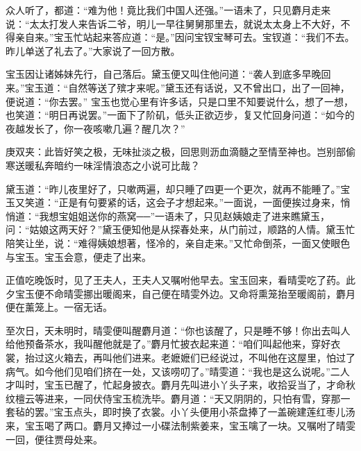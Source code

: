 \begin{parag}
    众人听了，都道：“难为他！竟比我们中国人还强。”一语未了，只见麝月走来说：“太太打发人来告诉二爷，明儿一早往舅舅那里去，就说太太身上不大好，不得亲自来。”宝玉忙站起来答应道：“是。”因问宝钗宝琴可去。宝钗道：“我们不去。昨儿单送了礼去了。”大家说了一回方散。
\end{parag}


\begin{parag}
    宝玉因让诸姊妹先行，自己落后。黛玉便又叫住他问道：“袭人到底多早晚回来。”宝玉道：“自然等送了殡才来呢。”黛玉还有话说，又不曾出口，出了一回神，便说道：“你去罢。” 宝玉也觉心里有许多话，只是口里不知要说什么，想了一想，也笑道：“明日再说罢。”一面下了阶矶，低头正欲迈步，复又忙回身问道：“如今的夜越发长了，你一夜咳嗽几遍？醒几次？”\begin{note}庚双夹：此皆好笑之极，无味扯淡之极，回思则沥血滴髓之至情至神也。岂别部偷寒送暖私奔暗约一味淫情浪态之小说可比哉？\end{note}黛玉道：“昨儿夜里好了，只嗽两遍，却只睡了四更一个更次，就再不能睡了。”宝玉又笑道：“正是有句要紧的话，这会子才想起来。”一面说，一面便挨过身来，悄悄道：“我想宝姐姐送你的燕窝──”一语未了，只见赵姨娘走了进来瞧黛玉，问：“姑娘这两天好？”黛玉便知他是从探春处来，从门前过，顺路的人情。黛玉忙陪笑让坐，说：“难得姨娘想著，怪冷的，亲自走来。”又忙命倒茶，一面又使眼色与宝玉。宝玉会意，便走了出来。
\end{parag}


\begin{parag}
    正值吃晚饭时，见了王夫人，王夫人又嘱咐他早去。宝玉回来，看晴雯吃了药。此夕宝玉便不命晴雯挪出暖阁来，自己便在晴雯外边。又命将熏笼抬至暖阁前，麝月便在薰笼上。一宿无话。
\end{parag}


\begin{parag}
    至次日，天未明时，晴雯便叫醒麝月道：“你也该醒了，只是睡不够！你出去叫人给他预备茶水，我叫醒他就是了。”麝月忙披衣起来道：“咱们叫起他来，穿好衣裳，抬过这火箱去，再叫他们进来。老嬷嬷们已经说过，不叫他在这屋里，怕过了病气。如今他们见咱们挤在一处，又该唠叨了。”晴雯道：“我也是这么说呢。”二人才叫时，宝玉已醒了，忙起身披衣。麝月先叫进小丫头子来，收拾妥当了，才命秋纹檀云等进来，一同伏侍宝玉梳洗毕。麝月道：“天又阴阴的，只怕有雪，穿那一套毡的罢。”宝玉点头，即时换了衣裳。小丫头便用小茶盘捧了一盖碗建莲红枣儿汤来，宝玉喝了两口。麝月又捧过一小碟法制紫姜来，宝玉噙了一块。又嘱咐了晴雯一回，便往贾母处来。
\end{parag}


